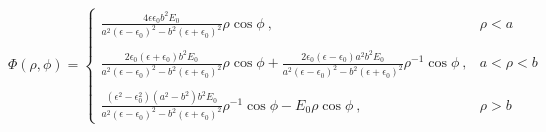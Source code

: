 \documentclass[12pt]{article}
\begin{document}
\begin{equation}
    \Phi(\rho, \phi) =
    \begin{cases}
        \frac{4 \epsilon \epsilon_0 b^2 E_0}{a^2(\epsilon- \epsilon_0)^2 - b^2(\epsilon + \epsilon_0)^2} \rho \cos \phi~, & \rho < a\\\\
        \frac{2\epsilon_0 (\epsilon + \epsilon_0) b^2 E_0}{a^2(\epsilon- \epsilon_0)^2 - b^2(\epsilon + \epsilon_0)^2} \rho \cos \phi + \frac{2\epsilon_0(\epsilon-\epsilon_0) a^2 b^2 E_0}{a^2(\epsilon- \epsilon_0)^2 - b^2(\epsilon + \epsilon_0)^2} \rho^{-1} \cos \phi~, & a < \rho < b\\\\
        \frac{(\epsilon^2 - \epsilon_0^2)(a^2 - b^2)b^2 E_0 }{a^2(\epsilon- \epsilon_0)^2 - b^2(\epsilon + \epsilon_0)^2} \rho^{-1} \cos\phi -E_0 \rho \cos \phi~, & \rho >b
    \end{cases}
\end{equation}
\end{document}
